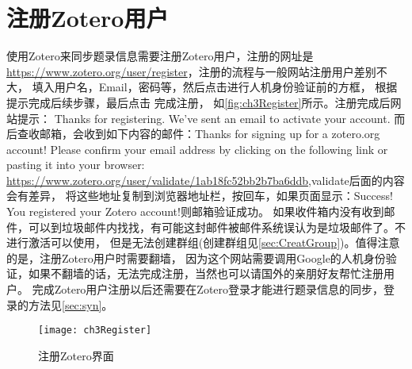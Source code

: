 \documentclass[cn,11pt,chinese]{elegantbook}
\begin{document}
			\section{注册Zotero用户}\label{sec:zotReg}
		使用Zotero来同步题录信息需要注册Zotero用户，注册的网址是\url{https://www.zotero.org/user/register}，注册的流程与一般网站注册用户差别不大，
		填入用户名，Email，密码等，然后点击进行人机身份验证前的方框，
		根据提示完成后续步骤，最后点击 完成注册，
		如\autoref{fig:ch3Register}所示。注册完成后网站提示：
		Thanks for registering. We’ve sent an email to activate your account.
		而后查收邮箱，会收到如下内容的邮件：Thanks for signing up for a zotero.org account! Please confirm your email address 
		by clicking on the following link or pasting it into your browser: 
		\url{https://www.zotero.org/user/validate/1ab18fc52bb2b7ba6ddb},validate后面的内容会有差异，
		将这些地址复制到浏览器地址栏，按回车，如果页面显示：Success! You registered your Zotero account!则邮箱验证成功。
		如果收件箱内没有收到邮件，可以到垃圾邮件内找找，有可能这封邮件被邮件系统误认为是垃圾邮件了。不进行激活可以使用，
		但是无法创建群组(创建群组见\cref{sec:CreatGroup})。值得注意的是，注册Zotero用户时需要翻墙，
		因为这个网站需要调用Google的人机身份验证，如果不翻墙的话，无法完成注册，当然也可以请国外的亲朋好友帮忙注册用户。
		完成Zotero用户注册以后还需要在Zotero登录才能进行题录信息的同步，登录的方法见\cref{sec:syn}。
		\begin{figure}[htbp]
			\centering
			\texttt{[image: ch3Register]}
			\caption{注册Zotero界面}
			\label{fig:ch3Register}
		\end{figure}
		
\end{document}
